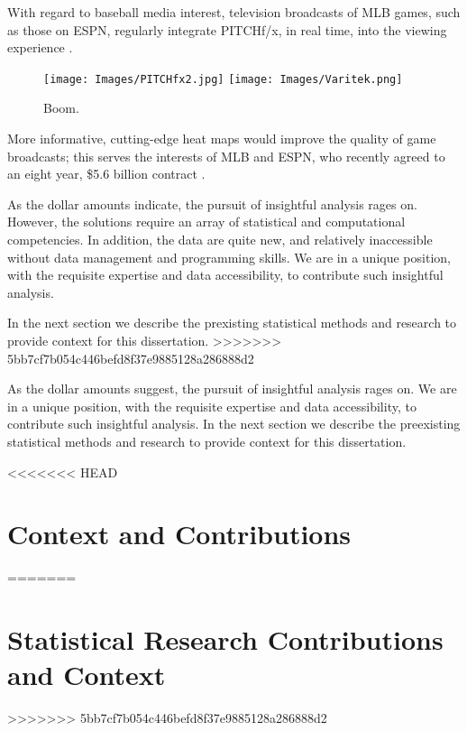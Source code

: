 With regard to baseball media interest, television broadcasts of MLB\textsuperscript{\textregistered} games, such as those on ESPN, regularly integrate PITCHf/x\textsuperscript{\textregistered}, in real time, into the viewing experience \citep{Cross2015}. 
        \begin{figure}[H]
      	\centering
      	\texttt{[image: Images/PITCHfx2.jpg]} 
      	\texttt{[image: Images/Varitek.png]} 
      	\caption{Boom.}
      	\end{figure} 
More informative, cutting-edge heat maps would improve the quality of game broadcasts; this serves the interests of MLB\textsuperscript{\textregistered} and  ESPN\textsuperscript{\textregistered}, who recently agreed to an eight year, \$5.6 billion contract \citep{Newman2012}.

As the dollar amounts indicate, the pursuit of insightful analysis rages on. However, the solutions require an array of statistical and computational competencies. In addition, the data are quite new, and relatively inaccessible without data management and programming skills. We are in a unique position, with the requisite expertise and data accessibility, to contribute such insightful analysis.

In the next section we describe the prexisting statistical methods and research to provide context for this dissertation.
>>>>>>> 5bb7cf7b054c446befd8f37e9885128a286888d2

As the dollar amounts suggest, the pursuit of insightful analysis rages on. We are in a unique position, with the requisite expertise and data accessibility, to contribute such insightful analysis. In the next section we describe the preexisting statistical methods and research to provide context for this dissertation.

<<<<<<< HEAD

\section{Context and Contributions}
=======
\section{Statistical Research Contributions and Context}
>>>>>>> 5bb7cf7b054c446befd8f37e9885128a286888d2

